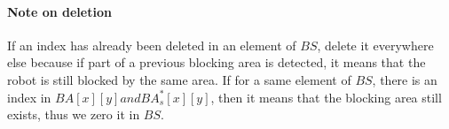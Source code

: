 \paragraph{Note on deletion}\label{deletion_note} If an index has already been deleted in an element of $BS$, delete it everywhere else because if part of a previous blocking area is detected, it means that the robot is still blocked by the same area. If for a same element of $BS$, there is an index in $BA[x][y] and BA^*_{s}[x][y]$, then it means that the blocking area still exists, thus we zero it in $BS$.



\clearpage


